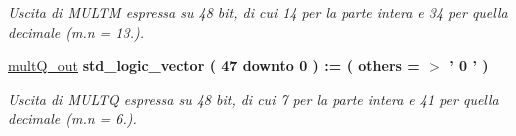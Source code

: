 \begin{DoxyCompactItemize}
\begin{DoxyCompactList}\small\item\em Uscita di M\+U\+L\+T\+M espressa su 48 bit, di cui 14 per la parte intera e 34 per quella decimale (m.\+n = 13.). \end{DoxyCompactList}\item 
\hyperlink{group___linear_regression_gab45555807d57a057b5cd46161e28b6a5}{mult\+Q\+\_\+out} {\bfseries \textcolor{vhdlchar}{std\+\_\+logic\+\_\+vector}\textcolor{vhdlchar}{ }\textcolor{vhdlchar}{(}\textcolor{vhdlchar}{ }\textcolor{vhdlchar}{ } \textcolor{vhdldigit}{47} \textcolor{vhdlchar}{ }\textcolor{vhdlchar}{downto}\textcolor{vhdlchar}{ }\textcolor{vhdlchar}{ } \textcolor{vhdldigit}{0} \textcolor{vhdlchar}{ }\textcolor{vhdlchar}{)}\textcolor{vhdlchar}{ }\textcolor{vhdlchar}{ }\textcolor{vhdlchar}{ }\textcolor{vhdlchar}{\+:}\textcolor{vhdlchar}{=}\textcolor{vhdlchar}{ }\textcolor{vhdlchar}{(}\textcolor{vhdlchar}{ }\textcolor{vhdlchar}{ }\textcolor{vhdlchar}{others}\textcolor{vhdlchar}{ }\textcolor{vhdlchar}{ }\textcolor{vhdlchar}{=}\textcolor{vhdlchar}{ }\textcolor{vhdlchar}{$>$}\textcolor{vhdlchar}{ }\textcolor{vhdlchar}{'}\textcolor{vhdlchar}{ } \textcolor{vhdldigit}{0} \textcolor{vhdlchar}{ }\textcolor{vhdlchar}{'}\textcolor{vhdlchar}{ }\textcolor{vhdlchar}{)}\textcolor{vhdlchar}{ }} 
\begin{DoxyCompactList}\small\item\em Uscita di M\+U\+L\+T\+Q espressa su 48 bit, di cui 7 per la parte intera e 41 per quella decimale (m.\+n = 6.). \end{DoxyCompactList}\end{DoxyCompactItemize}
